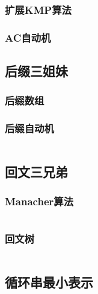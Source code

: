 \documentclass[a4paper]{article}
\newcommand{\cppcode}[1]{
    \inputminted[mathescape]{cpp}{source/#1}
}
\begin{document}
\subsubsection{扩展KMP算法}

\subsubsection{AC自动机}


\subsection{后缀三姐妹}

\subsubsection{后缀数组}


\subsubsection{后缀自动机}

\cppcode{string-manipulation/suffix-automation.cpp}

\subsection{回文三兄弟}

\subsubsection{Manacher算法}

\cppcode{string-manipulation/manacher.cpp}

\subsubsection{回文树}

\cppcode{string-manipulation/palindrome-tree.cpp}

\subsection{循环串最小表示}

\cppcode{string-manipulation/minimum-circular-representation.cpp}
\end{document}
